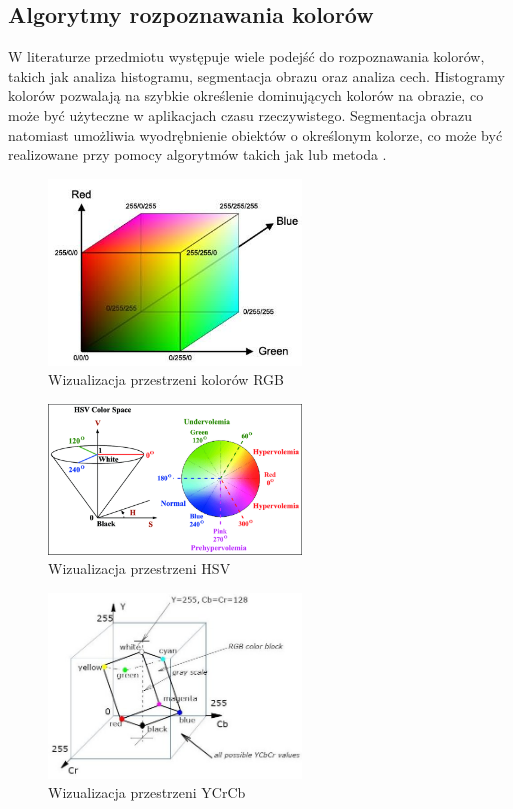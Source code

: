 \subsection{Algorytmy rozpoznawania kolorów}

W literaturze przedmiotu występuje wiele podejść do rozpoznawania kolorów, takich jak analiza histogramu, segmentacja obrazu oraz analiza cech. Histogramy kolorów pozwalają na szybkie określenie dominujących kolorów na obrazie, co może być użyteczne w aplikacjach czasu rzeczywistego. Segmentacja obrazu natomiast umożliwia wyodrębnienie obiektów o określonym kolorze, co może być realizowane przy pomocy algorytmów takich jak  lub metoda .


\begin{figure}[H]
    \centering
    \includegraphics[width=0.6\textwidth]{./graf/rgb-model.png}
    \caption{Wizualizacja przestrzeni kolorów RGB \cite{bib:rgb-model}}
    \label{rys2:rgb1}
\end{figure}

\begin{figure}[H]
    \centering
    \includegraphics[width=0.6\textwidth]{./graf/hsv-model.png}
    \caption{Wizualizacja przestrzeni HSV \cite{bib:hsv-model}}
    \label{rys2:hsv1}
\end{figure}

\begin{figure}[H]
    \centering
    \includegraphics[width=0.6\textwidth]{./graf/ycrcb-model.png}
    \caption{Wizualizacja przestrzeni YCrCb \cite{bib:ycrcb-model}}
    \label{rys2:ycrcb1}
\end{figure}


